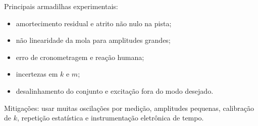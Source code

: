 Principais armadilhas experimentais:
\begin{itemize}
\item amortecimento residual e atrito não nulo na pista;
\item não linearidade da mola para amplitudes grandes;
\item erro de cronometragem e reação humana;
\item incertezas em $k$ e $m$;
\item desalinhamento do conjunto e excitação fora do modo desejado.
\end{itemize}
Mitigações: usar muitas oscilações por medição, amplitudes pequenas, calibração de $k$, repetição estatística e instrumentação eletrônica de tempo.


